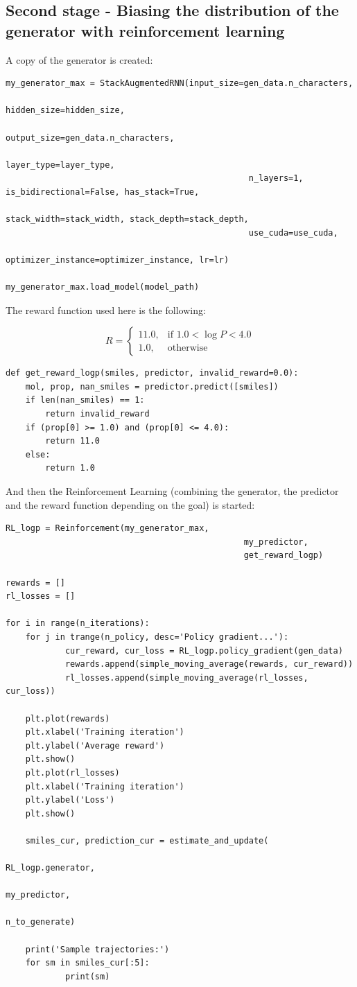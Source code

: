 \documentclass[a4paper]{article}
\begin{document}
\subsection{Second stage - Biasing the distribution of the generator with reinforcement learning}\label{sec:Second stage - Biasing the distribution of the generator with reinforcement learning}

A copy of the generator is created:

\begin{lstlisting}
my_generator_max = StackAugmentedRNN(input_size=gen_data.n_characters, 
												 hidden_size=hidden_size,
												 output_size=gen_data.n_characters, 
												 layer_type=layer_type,
												 n_layers=1, is_bidirectional=False, has_stack=True,
												 stack_width=stack_width, stack_depth=stack_depth, 
												 use_cuda=use_cuda, 
												 optimizer_instance=optimizer_instance, lr=lr)

my_generator_max.load_model(model_path)
\end{lstlisting}

The reward function used here is the following:

$$
R =  \begin{cases} 11.0, & \mbox{if } 1.0 < \log P < 4.0 \\ 1.0, & \mbox{otherwise}  \end{cases}
$$

\begin{lstlisting}
def get_reward_logp(smiles, predictor, invalid_reward=0.0):
    mol, prop, nan_smiles = predictor.predict([smiles])
    if len(nan_smiles) == 1:
        return invalid_reward
    if (prop[0] >= 1.0) and (prop[0] <= 4.0):
        return 11.0
    else:
        return 1.0
\end{lstlisting}

And then the Reinforcement Learning (combining the generator, the predictor and the reward function depending on the goal) is started:

\begin{lstlisting}
RL_logp = Reinforcement(my_generator_max, 
												my_predictor, 
												get_reward_logp)

rewards = []
rl_losses = []

for i in range(n_iterations):
	for j in trange(n_policy, desc='Policy gradient...'):
			cur_reward, cur_loss = RL_logp.policy_gradient(gen_data)
			rewards.append(simple_moving_average(rewards, cur_reward)) 
			rl_losses.append(simple_moving_average(rl_losses, cur_loss))
	
	plt.plot(rewards)
	plt.xlabel('Training iteration')
	plt.ylabel('Average reward')
	plt.show()
	plt.plot(rl_losses)
	plt.xlabel('Training iteration')
	plt.ylabel('Loss')
	plt.show()
			
	smiles_cur, prediction_cur = estimate_and_update(
																				RL_logp.generator, 
																				my_predictor, 
																				n_to_generate)
																									
	print('Sample trajectories:')
	for sm in smiles_cur[:5]:
			print(sm)
\end{lstlisting}
\end{document}
